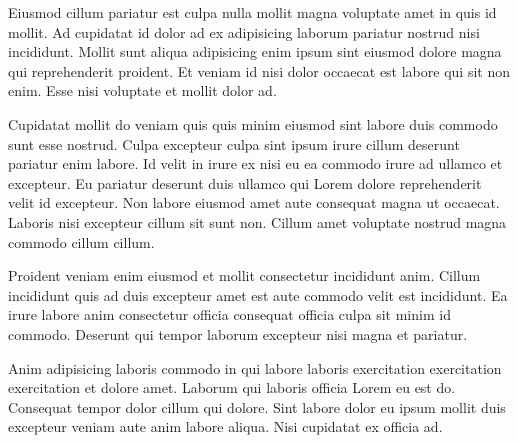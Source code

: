 Eiusmod cillum pariatur est culpa nulla mollit magna voluptate amet in quis id mollit. Ad cupidatat id dolor ad ex adipisicing laborum pariatur nostrud nisi incididunt. Mollit sunt aliqua adipisicing enim ipsum sint eiusmod dolore magna qui reprehenderit proident. Et veniam id nisi dolor occaecat est labore qui sit non enim. Esse nisi voluptate et mollit dolor ad.

Cupidatat mollit do veniam quis quis minim eiusmod sint labore duis commodo sunt esse nostrud. Culpa excepteur culpa sint ipsum irure cillum deserunt pariatur enim labore. Id velit in irure ex nisi eu ea commodo irure ad ullamco et excepteur. Eu pariatur deserunt duis ullamco qui Lorem dolore reprehenderit velit id excepteur. Non labore eiusmod amet aute consequat magna ut occaecat. Laboris nisi excepteur cillum sit sunt non. Cillum amet voluptate nostrud magna commodo cillum cillum.

Proident veniam enim eiusmod et mollit consectetur incididunt anim. Cillum incididunt quis ad duis excepteur amet est aute commodo velit est incididunt. Ea irure labore anim consectetur officia consequat officia culpa sit minim id commodo. Deserunt qui tempor laborum excepteur nisi magna et pariatur.

Anim adipisicing laboris commodo in qui labore laboris exercitation exercitation exercitation et dolore amet. Laborum qui laboris officia Lorem eu est do. Consequat tempor dolor cillum qui dolore. Sint labore dolor eu ipsum mollit duis excepteur veniam aute anim labore aliqua. Nisi cupidatat ex officia ad.